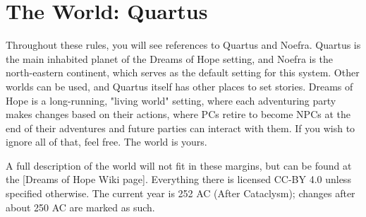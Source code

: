 \chapter{The World: Quartus}
Throughout these rules, you will see references to Quartus and Noefra. Quartus is the main inhabited planet of the Dreams of Hope setting, and Noefra is the north-eastern continent, which serves as the default setting for this system. Other worlds can be used, and Quartus itself has other places to set stories. Dreams of Hope is a long-running, "living world" setting, where each adventuring party makes changes based on their actions, where PCs retire to become NPCs at the end of their adventures and future parties can interact with them. If you wish to ignore all of that, feel free. The world is yours.

A full description of the world will not fit in these margins, but can be found at the \href{https://wiki.admiralbenbo.org}[Dreams of Hope Wiki page]. Everything there is licensed CC-BY 4.0 unless specified otherwise. The current year is 252 AC (After Cataclysm); changes after about 250 AC are marked as such.

